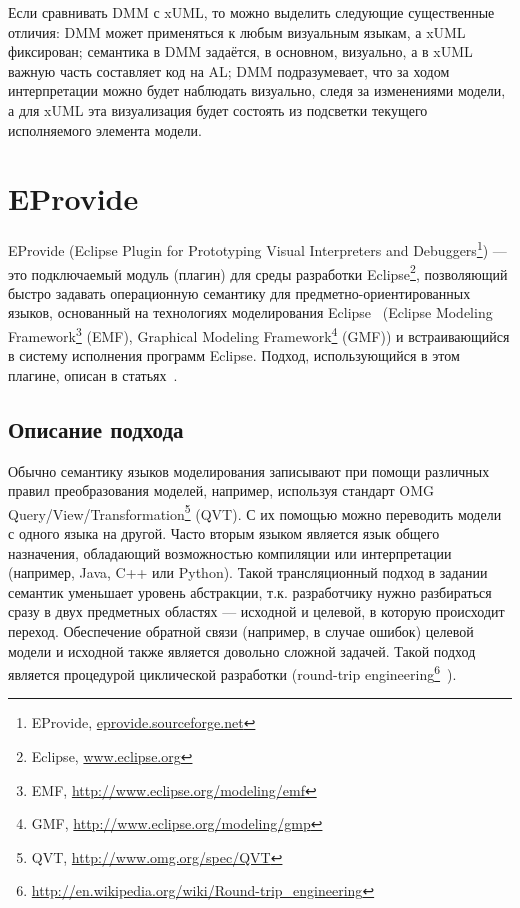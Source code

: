 \documentclass[a5paper]{article}
\begin{document}
Если сравнивать DMM с xUML, то можно выделить следующие существенные отличия: DMM может применяться к любым визуальным языкам, а xUML фиксирован; семантика в DMM задаётся, в основном, визуально, а в xUML важную часть составляет код на AL; DMM подразумевает, что за ходом интерпретации можно будет наблюдать визуально, следя за изменениями модели, а для xUML эта визуализация будет состоять из подсветки текущего исполняемого элемента модели. 

\section{EProvide}

EProvide (Eclipse Plugin for Prototyping Visual Interpreters and Debuggers\footnote{EProvide, \url{eprovide.sourceforge.net}}) --- это подключаемый модуль (плагин) для среды разработки Eclipse\footnote{Eclipse, \url{www.eclipse.org}}, позволяющий быстро задавать операционную семантику для предметно-ориентированных языков, основанный на технологиях моделирования Eclipse~\cite{koznov7} (Eclipse Modeling Framework\footnote{EMF, \url{http://www.eclipse.org/modeling/emf}} (EMF), Graphical Modeling Framework\footnote{GMF, \url{http://www.eclipse.org/modeling/gmp}} (GMF)) и встраивающийся в систему исполнения программ Eclipse. Подход, использующийся в этом плагине, описан в статьях~\cite{wachsmuth1, wachsmuth2}.

\subsection{Описание подхода}

Обычно семантику языков моделирования записывают при помощи различных правил преобразования моделей, например, используя стандарт OMG Query/View/Transformation\footnote{QVT, \url{http://www.omg.org/spec/QVT}} (QVT). С их помощью можно переводить модели с одного языка на другой. Часто вторым языком является язык общего назначения, обладающий возможностью компиляции или интерпретации (например, Java, C++ или Python). Такой трансляционный подход в задании семантик уменьшает уровень абстракции, т.к. разработчику нужно разбираться сразу в двух предметных областях --- исходной и целевой, в которую происходит переход. Обеспечение обратной связи (например, в случае ошибок) целевой модели и исходной также является довольно сложной задачей. Такой подход является процедурой циклической разработки (round-trip engineering\footnote{\url{http://en.wikipedia.org/wiki/Round-trip_engineering}}~\cite{roundtrip}).
\end{document}
